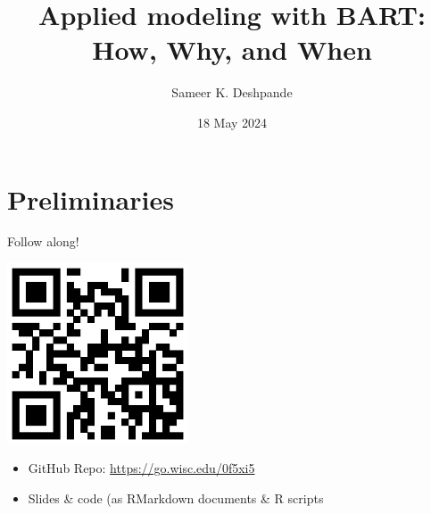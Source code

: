 \documentclass[aspectratio=199]{beamer}
\title[BART Introduction]{Applied modeling with BART: \\ How, Why, and When}
\author[S.K. Deshpande]{Sameer K. Deshpande}
\institute[UW--Madison]{University of Wisconsin--Madison}
\date[18 May 2024]{18 May 2024}
\begin{document}
\begin{frame}[noframenumbering]
\titlepage
\end{frame}

\section{Preliminaries}
\begin{frame}[noframenumbering]{Follow along!}

\begin{center}
\includegraphics[width = 0.4\textwidth]{figures/cmsac_bart}
\end{center}

\begin{itemize}
\item{GitHub Repo: \url{https://go.wisc.edu/0f5xi5}}
\item{Slides \& code (as RMarkdown documents \& \textsf{R} scripts}
\end{itemize}

\end{frame}
\end{document}
